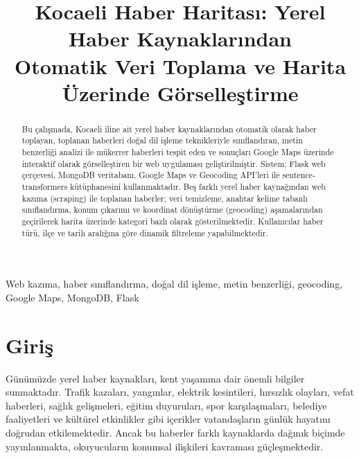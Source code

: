\documentclass[conference]{IEEEtran}
\begin{document}
\title{Kocaeli Haber Haritası: Yerel Haber Kaynaklarından\\Otomatik Veri Toplama ve Harita Üzerinde Görselleştirme}

\author{
}

\maketitle

\begin{abstract}
Bu çalışmada, Kocaeli iline ait yerel haber kaynaklarından otomatik olarak haber toplayan, toplanan haberleri doğal dil işleme teknikleriyle sınıflandıran, metin benzerliği analizi ile mükerrer haberleri tespit eden ve sonuçları Google Maps üzerinde interaktif olarak görselleştiren bir web uygulaması geliştirilmiştir. Sistem; Flask web çerçevesi, MongoDB veritabanı, Google Maps ve Geocoding API'leri ile sentence-transformers kütüphanesini kullanmaktadır. Beş farklı yerel haber kaynağından web kazıma (scraping) ile toplanan haberler; veri temizleme, anahtar kelime tabanlı sınıflandırma, konum çıkarımı ve koordinat dönüştürme (geocoding) aşamalarından geçirilerek harita üzerinde kategori bazlı olarak gösterilmektedir. Kullanıcılar haber türü, ilçe ve tarih aralığına göre dinamik filtreleme yapabilmektedir.
\end{abstract}

\begin{IEEEkeywords}
Web kazıma, haber sınıflandırma, doğal dil işleme, metin benzerliği, geocoding, Google Maps, MongoDB, Flask
\end{IEEEkeywords}

\section{Giriş}

Günümüzde yerel haber kaynakları, kent yaşamına dair önemli bilgiler sunmaktadır. Trafik kazaları, yangınlar, elektrik kesintileri, hırsızlık olayları, vefat haberleri, sağlık gelişmeleri, eğitim duyuruları, spor karşılaşmaları, belediye faaliyetleri ve kültürel etkinlikler gibi içerikler vatandaşların günlük hayatını doğrudan etkilemektedir. Ancak bu haberler farklı kaynaklarda dağınık biçimde yayınlanmakta, okuyucuların konumsal ilişkileri kavraması güçleşmektedir.
\end{document}
